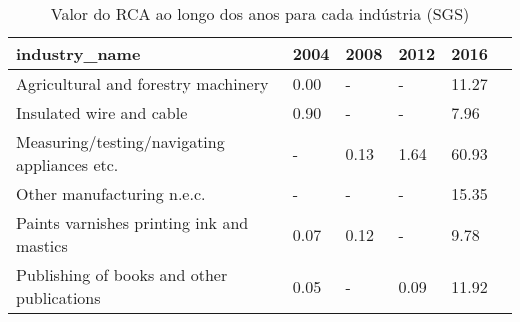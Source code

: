 \begin{table}
\centering
\caption{Valor do RCA ao longo dos anos para cada indústria (SGS)}
\begin{tabular}{p{6cm}p{1.5cm}p{1.5cm}p{1.5cm}p{1.5cm}p{1.5cm}}
\toprule
                               industry\_name & 2004 & 2008 & 2012 &  2016 \\
\midrule
         Agricultural and forestry machinery & 0.00 &    - &    - & 11.27 \\
                    Insulated wire and cable & 0.90 &    - &    - &  7.96 \\
Measuring/testing/navigating appliances etc. &    - & 0.13 & 1.64 & 60.93 \\
                  Other manufacturing n.e.c. &    - &    - &    - & 15.35 \\
   Paints varnishes printing ink and mastics & 0.07 & 0.12 &    - &  9.78 \\
  Publishing of books and other publications & 0.05 &    - & 0.09 & 11.92 \\
\bottomrule
\end{tabular}
\end{table}
